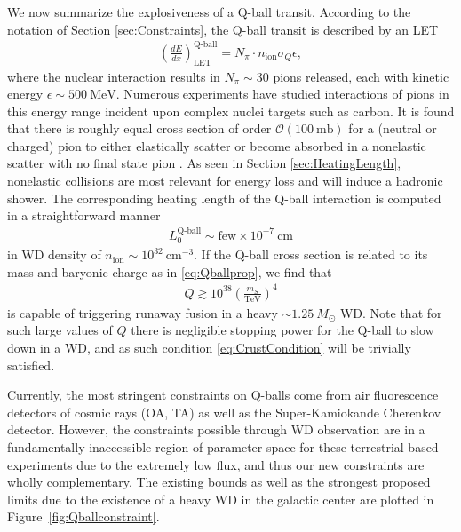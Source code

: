 \documentclass[twocolumn,showpacs,preprintnumbers,amsmath,amssymb,prd]{revtex4}
\newcommand{\OO}{\mathcal{O}}
\def\r{\right)}
\def\l{\left(}
\begin{document}
We now summarize the explosiveness of a Q-ball transit.
According to the notation of Section \ref{sec:Constraints}, the Q-ball transit is described by an LET
\begin{align}
\left( \frac{d E}{d x} \right)^\text{Q-ball}_\text{LET} = N_\pi \cdot n_\text{ion} \sigma_Q \epsilon,
\end{align}
where the nuclear interaction results in $N_\pi \sim 30$ pions released, each with kinetic energy $\epsilon \sim 500 ~\text{MeV}$.
Numerous experiments have studied interactions of pions in this energy range incident upon complex nuclei targets such as carbon.
It is found that there is roughly equal cross section of order $\OO (100 ~\text{mb})$ for a (neutral or charged) pion to either elastically scatter or become absorbed in a nonelastic scatter with no final state pion \cite{Pionnuclear}.
As seen in Section \ref{sec:HeatingLength}, nonelastic collisions are most relevant for energy loss and will induce a hadronic shower.
The corresponding heating length of the Q-ball interaction is computed in a straightforward manner
\begin{align}
L_0^\text{Q-ball} \sim \text{few} \times 10^{-7} ~\text{cm}
\end{align}
in WD density of $n_\text{ion} \sim 10^{32} ~\text{cm}^{-3}$.
If the Q-ball cross section is related to its mass and baryonic charge as in \eqref{eq:Qballprop}, we find that 
\begin{align}
Q \gtrsim 10^{38} \l\frac{m_S}{\text{TeV}}\r^4
\end{align}
is capable of triggering runaway fusion in a heavy $\sim 1.25 ~M_{\odot}$ WD.
Note that for such large values of $Q$ there is negligible stopping power for the Q-ball to slow down in a WD, and as such condition \eqref{eq:CrustCondition} will be trivially satisfied.

Currently, the most stringent constraints on Q-balls come from air fluorescence detectors of cosmic rays (OA, TA) as well as the Super-Kamiokande Cherenkov detector.
However, the constraints possible through WD observation are in a fundamentally inaccessible region of parameter space for these terrestrial-based experiments due to the extremely low flux, and thus our new constraints are wholly complementary.
The existing bounds as well as the strongest proposed limits due to the existence of a heavy WD in the galactic center are plotted in Figure~\ref{fig:Qballconstraint}.
\end{document}
